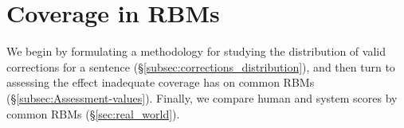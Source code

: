 \documentclass[a4paper]{article}
\begin{document}
%
%
%
%
%
%
%

\section{Coverage in RBMs}\label{sec:increase-reference}

We begin by formulating a methodology for studying the distribution of valid 
corrections for a sentence (\S\ref{subsec:corrections_distribution}), 
and then turn to assessing the effect inadequate 
coverage has on common RBMs (\S\ref{subsec:Assessment-values}). 
Finally, we compare human and system scores by common RBMs (\S\ref{sec:real_world}).

\end{document}
